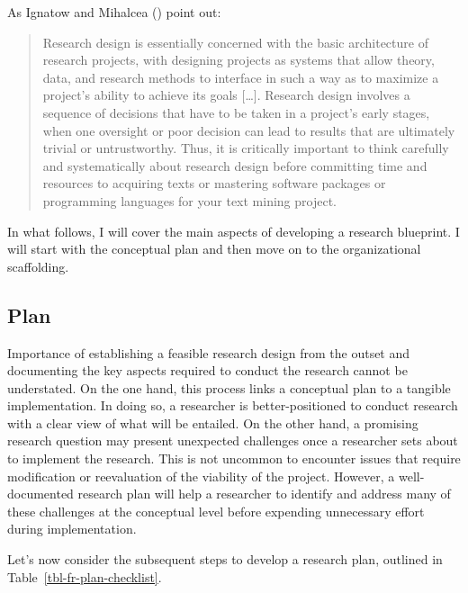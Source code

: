 \documentclass[
  letterpaper,
]{latex/krantz}
\theoremstyle{definition}
\theoremstyle{remark}
\begin{document}
As Ignatow and Mihalcea () point out:

\begin{quote}
Research design is essentially concerned with the basic architecture of
research projects, with designing projects as systems that allow theory,
data, and research methods to interface in such a way as to maximize a
project's ability to achieve its goals {[}\ldots{]}. Research design
involves a sequence of decisions that have to be taken in a project's
early stages, when one oversight or poor decision can lead to results
that are ultimately trivial or untrustworthy. Thus, it is critically
important to think carefully and systematically about research design
before committing time and resources to acquiring texts or mastering
software packages or programming languages for your text mining project.
\end{quote}

In what follows, I will cover the main aspects of developing a research
blueprint. I will start with the conceptual plan and then move on to the
organizational scaffolding.

\subsection{Plan}\label{sec-fr-plan}

Importance of establishing a feasible research design from the outset
and documenting the key aspects required to conduct the research cannot
be understated. On the one hand, this process links a conceptual plan to
a tangible implementation. In doing so, a researcher is
better-positioned to conduct research with a clear view of what will be
entailed. On the other hand, a promising research question may present
unexpected challenges once a researcher sets about to implement the
research. This is not uncommon to encounter issues that require
modification or reevaluation of the viability of the project. However, a
well-documented research plan will help a researcher to identify and
address many of these challenges at the conceptual level before
expending unnecessary effort during implementation.

Let's now consider the subsequent steps to develop a research plan,
outlined in Table~\ref{tbl-fr-plan-checklist}.
\end{document}
